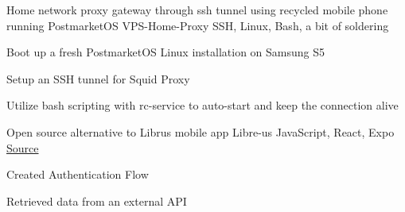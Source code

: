 \begin{cventries}

  \cventry
  {Home network proxy gateway through ssh tunnel using recycled mobile phone running PostmarketOS} %
  {VPS-Home-Proxy} %
  {SSH, Linux, Bash, a bit of soldering} %
  {} %
  {
    \begin{cvitems} %
      \item {Boot up a fresh PostmarketOS Linux installation on Samsung S5}
      \item {Setup an SSH tunnel for Squid Proxy}
      \item {Utilize bash scripting with rc-service to auto-start and keep the connection alive}
    \end{cvitems}
  } %

  \cventry
    {Open source alternative to Librus mobile app} %
    {Libre-us} %
    {JavaScript, React, Expo} %
    {\href{https://github.com/rustysnek/libre-us}{\faGithubSquare\acvHeaderIconSep Source}} %
    {
      \begin{cvitems} %
        \item {Created Authentication Flow}
        \item {Retrieved data from an external API}
      \end{cvitems}
    } %
\end{cventries}
